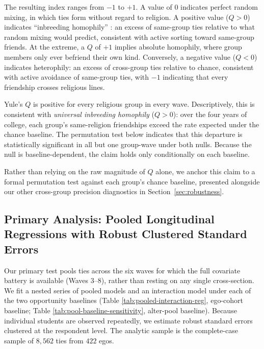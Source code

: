 \documentclass[11pt]{article}
\begin{document}
The resulting index ranges from $-1$ to $+1$. A value of $0$ indicates perfect random mixing, in which ties form without regard to religion. A positive value ($Q > 0$) indicates ``inbreeding homophily'' \citep{marsden1988}: an excess of same-group ties relative to what random mixing would predict, consistent with active sorting toward same-group friends. At the extreme, a $Q$ of $+1$ implies absolute homophily, where group members only ever befriend their own kind. Conversely, a negative value ($Q < 0$) indicates heterophily: an excess of cross-group ties relative to chance, consistent with active avoidance of same-group ties, with $-1$ indicating that every friendship crosses religious lines.


Yule's $Q$ is positive for every religious group in every wave. Descriptively, this is consistent with \textit{universal inbreeding homophily} ($Q > 0$): over the four years of college, each group's same-religion friendships exceed the rate expected under the chance baseline. The permutation test below indicates that this departure is statistically significant in all but one group-wave under both nulls. Because the null is baseline-dependent, the claim holds only conditionally on each baseline.

Rather than relying on the raw magnitude of $Q$ alone, we anchor this claim to a formal permutation test against each group's chance baseline, presented alongside our other cross-group precision diagnostics in Section~\ref{sec:robustness}.

\subsection{Primary Analysis: Pooled Longitudinal Regressions with Robust Clustered Standard Errors}

Our primary test pools ties across the six waves for which the full covariate battery is available (Waves 3--8), rather than resting on any single cross-section. We fit a nested series of pooled models and an interaction model under each of the two opportunity baselines (Table \ref{tab:pooled-interaction-reg}, ego-cohort baseline; Table \ref{tab:pool-baseline-sensitivity}, alter-pool baseline). Because individual students are observed repeatedly, we estimate robust standard errors clustered at the respondent level. The analytic sample is the complete-case sample of $8{,}562$ ties from $422$ egos.
\end{document}
